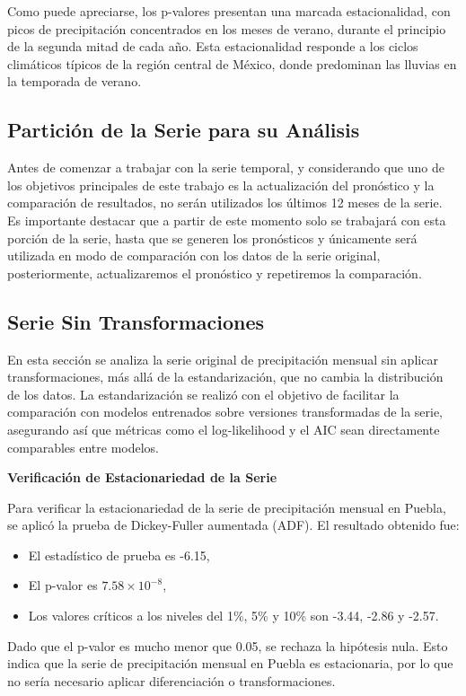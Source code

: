 \documentclass[12pt,letterpaper]{article}   %
\begin{document}
 Como puede apreciarse, los p-valores presentan una marcada estacionalidad, con picos de precipitación concentrados en los meses de verano, durante el principio de la segunda mitad de cada año. Esta estacionalidad responde a los ciclos climáticos típicos de la región central de México, donde predominan las lluvias en la temporada de verano.


\subsection{Partición de la Serie para su Análisis}
Antes de comenzar a trabajar con la serie temporal, y considerando que uno de los objetivos principales de este trabajo es la actualización del pronóstico y la comparación de resultados, no serán utilizados los últimos 12 meses de la serie. Es importante destacar que a partir de este momento solo se trabajará con esta porción de la serie, hasta que se generen los pronósticos y únicamente será utilizada en modo de comparación con los datos de la serie original, posteriormente, actualizaremos el pronóstico y repetiremos la comparación.

\subsection{Serie Sin Transformaciones}
En esta sección se analiza la serie original de precipitación mensual sin aplicar transformaciones, más allá de la estandarización, que no cambia la distribución de los datos. La estandarización se realizó con el objetivo de facilitar la comparación con modelos entrenados sobre versiones transformadas de la serie, asegurando así que métricas como el log-likelihood y el AIC sean directamente comparables entre modelos.

\textbf{Verificación de Estacionariedad de la Serie}


Para verificar la estacionariedad de la serie de precipitación mensual en Puebla, se aplicó la prueba de Dickey-Fuller aumentada (ADF). El resultado obtenido fue:
\begin{itemize}
    \item El estadístico de prueba es -6.15,
    \item El p-valor es $7.58 \times 10^{-8}$,
    \item Los valores críticos a los niveles del 1\%, 5\% y 10\% son -3.44, -2.86 y -2.57.
\end{itemize}


Dado que el p-valor es mucho menor que 0.05, se rechaza la hipótesis nula. Esto indica que la serie de precipitación mensual en Puebla es estacionaria, por lo que no sería necesario aplicar diferenciación o transformaciones.
\end{document}
